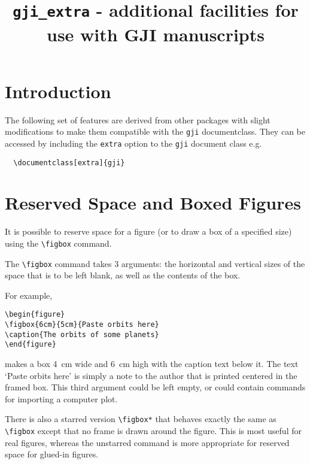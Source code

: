 \documentclass[extra,mreferee]{gji}
\title[\texttt{gji\_extra.sty} ]  
  {\texttt{gji\_extra} - additional facilities for use with GJI
manuscripts}
\author[]  {}
\begin{document}
\maketitle

\section{Introduction}
The following set of features are derived from other packages with
slight modifications to make them compatible with the \verb"gji"
documentclass. They can be accessed by including the \verb"extra"
option to the \verb"gji" document class e.g.
\begin{verbatim}
  \documentclass[extra]{gji}
\end{verbatim}

\section{Reserved Space and Boxed Figures }

It is possible to reserve space for a figure (or to draw a box of
a specified size) using the \verb!\figbox! command.

The \verb!\figbox! command takes 3 arguments: the
horizontal and vertical sizes of the space that is to be left blank, as well
as the contents of the box.


For example,
\begin{verbatim}
\begin{figure}
\figbox{6cm}{5cm}{Paste orbits here}
\caption{The orbits of some planets}
\end{figure}
\end{verbatim}
\begin{figure*}
\caption{Illustrating the use of the figbox command for a
display of the orbits of some planets}
\end{figure*}
makes a box 4~cm wide and 6~cm high with the caption text below it.
The text `Paste orbits here' is simply a note to the author that is
printed centered in the framed box. This third argument could be left empty,
or could contain commands for importing a computer plot.  

There is also a starred version \verb!\figbox*! that behaves exactly the same
as \verb!\figbox! except that no frame is drawn around the figure. This is
most useful for real figures, whereas the unstarred command is more
appropriate for reserved space for glued-in figures.
\end{document}
